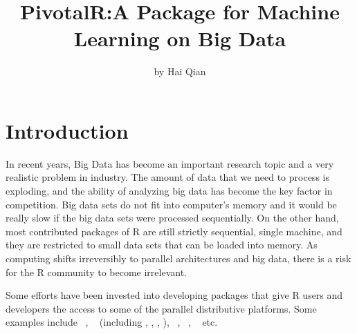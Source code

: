 
\title{PivotalR:\@ A Package for Machine Learning on Big Data}
\author{by Hai Qian}

\maketitle


\section{Introduction}





In recent years, Big Data has become an important research topic and a
very realistic problem in industry. The amount of data that we need to
process is exploding, and the ability of analyzing big data has become
the key factor in competition. Big data sets do not fit into
computer's memory and it would be really slow if the big data sets
were processed sequentially. On the other hand, most contributed
packages of R are still strictly sequential, single machine, and they
are restricted to small data sets that can be loaded into memory. As
computing shifts irreversibly to parallel architectures and big data,
there is a risk for the R community to become irrelevant.

Some efforts have been invested into developing packages that give R
users and developers the access to some of the parallel distributive
platforms. Some examples include ~\citep{dplyr},
~\citep{RHadoop} (including , ,
, ), ~\citep{RHIPE},
~\citep{RHive}, ~\citep{teradatar} etc.

